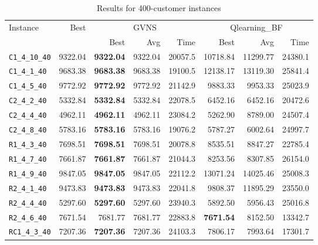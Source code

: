 \begin{table}[ht]
\centering
\small
\setlength{\tabcolsep}{5pt}
\caption{Results for 400-customer instances}
\vspace{4mm}
\begin{adjustbox}{width=\textwidth}
\begin{tabular}{l r r r r @{\hspace{8pt}} r r r @{\hspace{8pt}}}
\toprule
\multirow{2}{*}{Instance} & \multirow{2}{*}{Best} & \multicolumn{3}{c}{GVNS} & \multicolumn{3}{c}{Qlearning\_BF} \\
\cmidrule(lr){3-5} \cmidrule(lr){6-8}
 &  & Best & Avg & Time & Best & Avg & Time \\
\midrule
\texttt{C1\_4\_10\_40} & 9322.04 & \textbf{9322.04} & 9322.04 & 20057.5 & 10718.84 & 11299.77 & 24380.1 \\
\texttt{C1\_4\_1\_40} & 9683.38 & \textbf{9683.38} & 9683.38 & 19100.5 & 12138.17 & 13119.30 & 25841.4 \\
\texttt{C1\_4\_5\_40} & 9772.92 & \textbf{9772.92} & 9772.92 & 21142.9 & 9883.33 & 9953.33 & 25023.9 \\
\texttt{C2\_4\_2\_40} & 5332.84 & \textbf{5332.84} & 5332.84 & 22078.5 & 6452.16 & 6452.16 & 20472.6 \\
\texttt{C2\_4\_4\_40} & 4962.11 & \textbf{4962.11} & 4962.11 & 23084.2 & 5262.90 & 8789.00 & 24507.4 \\
\texttt{C2\_4\_8\_40} & 5783.16 & \textbf{5783.16} & 5783.16 & 19076.2 & 5787.27 & 6002.64 & 24997.7 \\
\texttt{R1\_4\_3\_40} & 7698.51 & \textbf{7698.51} & 7698.51 & 20078.8 & 8535.51 & 8847.27 & 22785.4 \\
\texttt{R1\_4\_7\_40} & 7661.87 & \textbf{7661.87} & 7661.87 & 21044.3 & 8253.56 & 8307.85 & 26154.0 \\
\texttt{R1\_4\_9\_40} & 9847.05 & \textbf{9847.05} & 9847.05 & 22112.2 & 13071.24 & 14025.46 & 25008.3 \\
\texttt{R2\_4\_1\_40} & 9473.83 & \textbf{9473.83} & 9473.83 & 22041.8 & 9808.37 & 11895.29 & 23550.0 \\
\texttt{R2\_4\_4\_40} & 5297.60 & \textbf{5297.60} & 5297.60 & 23940.3 & 5892.50 & 5956.43 & 25016.8 \\
\texttt{R2\_4\_6\_40} & 7671.54 & 7681.77 & 7681.77 & 22883.8 & \textbf{7671.54} & 8152.50 & 13342.7 \\
\texttt{RC1\_4\_3\_40} & 7207.36 & \textbf{7207.36} & 7207.36 & 24103.3 & 7806.17 & 7993.64 & 17301.7 \\

\end{tabular}
\end{adjustbox}
\end{table}
